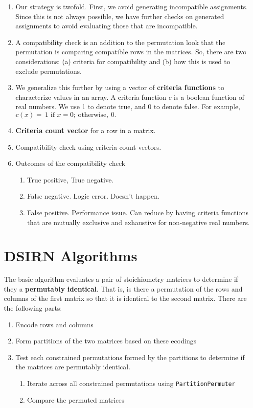 \documentclass{article}
\begin{document}
\begin{enumerate}
    \item Our strategy is twofold. First, we avoid generating incompatible assignments. Since this is not always possible, we have further checks on generated assignments to avoid evaluating those that are incompatible.
    \item A compatibility check is an addition to the permutation look that the permutation is comparing compatible rows in the matrices. So, there are two considerations: (a) criteria for compatibility and (b) how this is used to exclude permutations.
    \item We generalize this further by using a vector of {\bf criteria functions} to characterize values in an array. A criteria function $c$ is a boolean function of real numbers. We use 1 to denote true, and 0 to denote false. For example, $c(x)= ~1\text{ if }x=0;~ \text{otherwise},~ 0.$
    \item {\bf Criteria count vector} for a row in a matrix.
    \item Compatibility check using criteria count vectors.
    \item Outcomes of the compatibility check
    \begin{enumerate}
        \item True positive, True negative.
        \item False negative. Logic error. Doesn't happen.
        \item False positive. Performance issue. Can reduce by having criteria functions that are mutually exclusive and exhaustive for non-negative real numbers.
    \end{enumerate}

\end{enumerate}

\section{DSIRN Algorithms}
The basic algorithm evaluates a pair of stoichiometry
matrices to determine if they a {\bf permutably identical}. That is, is there a permutation of the rows and columns of the first matrix so that it is identical to the second matrix.
There are the following parts:
\begin{enumerate}
    \item Encode rows and columns
    \item Form partitions of the two matrices based on these ecodings
    \item Test each constrained permutations formed by the partitions to determine if the matrices are permutably identical.
    \begin{enumerate}
        \item Iterate across all constrained permutations using {\tt PartitionPermuter}
        \item Compare the permuted matrices
    \end{enumerate}
\end{enumerate}
\end{document}
